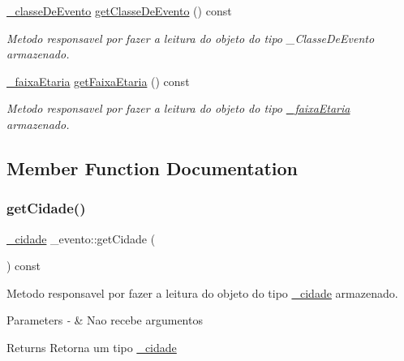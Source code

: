 \begin{DoxyCompactItemize}
\mbox{\hyperlink{class__classe_de_evento}{\+\_\+classe\+De\+Evento}} \mbox{\hyperlink{class__evento_a0ba1f1c250f118c0df6b65eb638c3dda}{get\+Classe\+De\+Evento}} () const
\begin{DoxyCompactList}\small\item\em Metodo responsavel por fazer a leitura do objeto do tipo \+\_\+\+Classe\+De\+Evento armazenado. \end{DoxyCompactList}\item 
\mbox{\hyperlink{class__faixa_etaria}{\+\_\+faixa\+Etaria}} \mbox{\hyperlink{class__evento_a74d6c8e752392dc3093c1a296033bbb1}{get\+Faixa\+Etaria}} () const
\begin{DoxyCompactList}\small\item\em Metodo responsavel por fazer a leitura do objeto do tipo \mbox{\hyperlink{class__faixa_etaria}{\+\_\+faixa\+Etaria}} armazenado. \end{DoxyCompactList}\end{DoxyCompactItemize}


\subsection{Member Function Documentation}
\mbox{\label{class__evento_a364e71fdeb3267c9fb32b1964b9168e3}} 
\subsubsection{\texorpdfstring{getCidade()}{getCidade()}}
{\footnotesize\ttfamily \mbox{\hyperlink{class__cidade}{\+\_\+cidade}} \+\_\+evento\+::get\+Cidade (\begin{DoxyParamCaption}{ }\end{DoxyParamCaption}) const}



Metodo responsavel por fazer a leitura do objeto do tipo \mbox{\hyperlink{class__cidade}{\+\_\+cidade}} armazenado. 


\begin{DoxyParams}{Parameters}
{\em -\/} & Nao recebe argumentos \\
\hline
\end{DoxyParams}
\begin{DoxyReturn}{Returns}
Retorna um tipo \mbox{\hyperlink{class__cidade}{\+\_\+cidade}} 
\end{DoxyReturn}
\mbox{\label{class__evento_a0ba1f1c250f118c0df6b65eb638c3dda}} 
